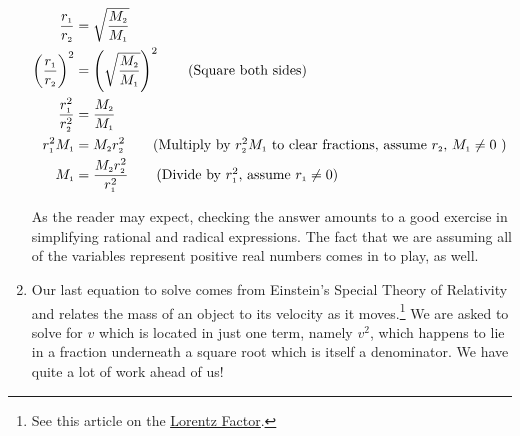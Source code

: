 \begin{ex}
\begin{enumerate}
\begin{align*}
 \dfrac{r_{\text{\tiny$1$}}}{r_{\text{\tiny$2$}}} & =  \sqrt{\dfrac{M_{\text{\tiny$2$}}}{M_{\text{\tiny$1$}}}} & \\
\left(\dfrac{r_{\text{\tiny$1$}}}{r_{\text{\tiny$2$}}}\right)^2 & = \left(\sqrt{\dfrac{M_{\text{\tiny$2$}}}{M_{\text{\tiny$1$}}}}\right)^2 \tag{Square both sides} \\
\dfrac{r_{\text{\tiny$1$}}^2}{r_{\text{\tiny$2$}}^2} & = \dfrac{M_{\text{\tiny$2$}}}{M_{\text{\tiny$1$}}} & \\
r_{\text{\tiny$1$}}^2 M_{\text{\tiny$1$}} & = M_{\text{\tiny$2$}}r_{\text{\tiny$2$}}^2 \tag{Multiply by $r_{\text{\tiny$2$}}^2 M_{\text{\tiny$1$}}$ to clear fractions, assume $r_{\text{\tiny$2$}}$,  $M_{\text{\tiny$1$}} \neq 0$ } \\
M_{\text{\tiny$1$}} & = \dfrac{M_{\text{\tiny$2$}}r_{\text{\tiny$2$}}^2}{r_{\text{\tiny$1$}}^2} \tag{Divide by $r_{\text{\tiny$1$}}^2$, assume $r_{\text{\tiny$1$}} \neq 0$} \\
\end{align*}

As the reader may expect, checking the answer amounts to a good exercise in simplifying rational and radical expressions.  The fact that we are assuming all of the variables represent positive real numbers comes in to play, as well.

\item  Our last equation to solve comes from Einstein's Special Theory of Relativity and relates the mass of an object to its velocity as it moves.\footnote{See this article on the \href{http://en.wikipedia.org/wiki/Lorentz_factor}{\underline{Lorentz Factor}}.} We are asked to solve for $v$ which is located in just one term, namely $v^2$, which happens to lie in a fraction underneath a square root which is itself a denominator. We have quite a lot of work ahead of us!


\end{enumerate}
\end{ex}
